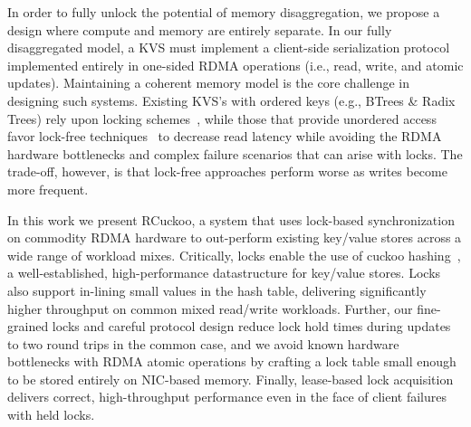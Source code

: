 In order to fully unlock the potential of memory disaggregation, we
propose a design where compute and memory are entirely separate. In
our fully disaggregated model, a KVS must implement a client-side
serialization protocol implemented entirely in one-sided RDMA
operations (i.e., read, write, and atomic updates).  Maintaining a coherent memory model is
the core challenge in designing such systems. Existing KVS's with ordered keys
(e.g., BTrees \& Radix Trees) rely upon locking schemes~\cite{smart,sherman}, while those that
provide unordered access favor lock-free techniques~\cite{rolex,ditto,fusee,clover} to decrease read
latency while avoiding the RDMA hardware bottlenecks and complex failure scenarios that can arise
with locks.  The trade-off, however, is that lock-free approaches perform worse as writes become
more frequent.

In this work we present RCuckoo, a system that uses lock-based synchronization
on commodity RDMA hardware to out-perform existing key/value stores across a
wide range of workload mixes.
Critically, locks enable the use of cuckoo hashing~\cite{cuckoo}, a
well-established, high-performance datastructure for key/value stores.
Locks also support in-lining small values in the hash table,
delivering
significantly higher throughput on common mixed read/write workloads.
Further, our fine-grained locks and careful protocol design reduce
lock hold times during updates to two round trips in the common
case, and we avoid known hardware bottlenecks with RDMA atomic
operations by crafting a lock table small enough to be stored entirely
on NIC-based memory.  Finally, lease-based lock acquisition
delivers correct, high-throughput performance even in the
face of client failures with held locks.

